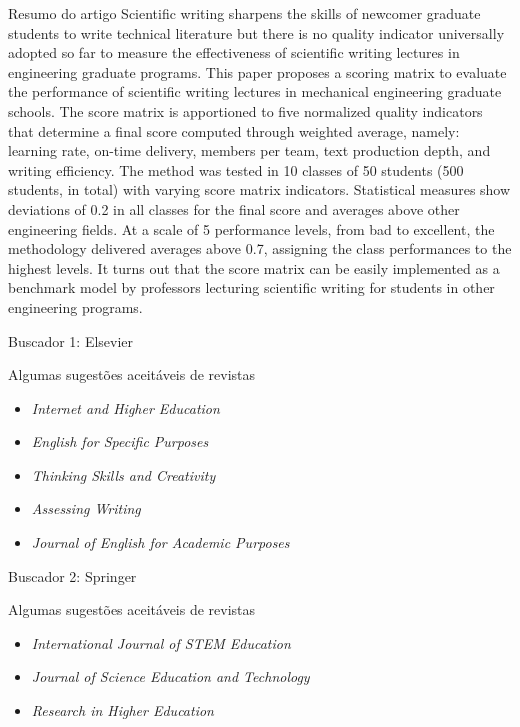 \begin{frame}
\begin{block}{Resumo do artigo}
\scriptsize{Scientific writing sharpens the skills of newcomer graduate students to write technical literature but there is no quality indicator universally adopted so far to measure the effectiveness of scientific writing lectures in engineering graduate programs. This paper proposes a scoring matrix to evaluate the performance of scientific writing lectures in mechanical engineering graduate schools. The score matrix is apportioned to five normalized quality indicators that determine a final score computed through weighted average, namely: learning rate, on-time delivery, members per team, text production depth, and writing efficiency. The method was tested in 10 classes of 50 students (500 students, in total) with varying score matrix indicators. Statistical measures show deviations of 0.2 in all classes for the final score and averages above other engineering fields. At a scale of 5 performance levels, from bad to excellent, the methodology delivered averages above 0.7, assigning the class performances to the highest levels. It turns out that the score matrix can be easily implemented as a benchmark model by professors lecturing scientific writing for students in other engineering programs.}
\end{block}
\end{frame}

\begin{frame}{Buscador 1: Elsevier}
\begin{block}{Algumas sugestões aceitáveis de revistas}
\begin{itemize}
\item \emph{Internet and Higher Education}
\item \emph{English for Specific Purposes}
\item \emph{Thinking Skills and Creativity}
\item \emph{Assessing Writing}
\item \emph{Journal of English for Academic Purposes}
\end{itemize}
\end{block}
\end{frame}

\begin{frame}{Buscador 2: Springer}
\begin{block}{Algumas sugestões aceitáveis de revistas}
\begin{itemize}
\item \emph{International Journal of STEM Education}
\item \emph{Journal of Science Education and Technology}
\item \emph{Research in Higher Education}
\end{itemize}
\end{block}
\end{frame}

